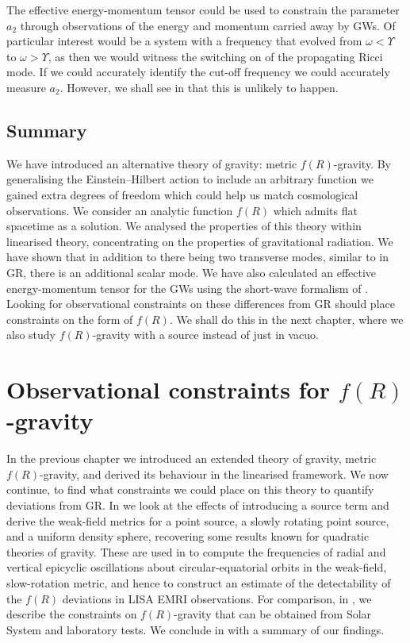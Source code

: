 The effective energy-momentum tensor could be used to constrain the parameter $a_2$ through observations of the energy and momentum carried away by GWs. Of particular interest would be a system with a frequency that evolved from $\omega < \Upsilon$ to $\omega > \Upsilon$, as then we would witness the switching on of the propagating Ricci mode. If we could accurately identify the cut-off frequency we could accurately measure $a_2$. However, we shall see in  that this is unlikely to happen.

\section{Summary}

We have introduced an alternative theory of gravity: metric $f(R)$-gravity. By generalising the Einstein--Hilbert action to include an arbitrary function we gained extra degrees of freedom which could help us match cosmological observations. We consider an analytic function $f(R)$ which admits flat spacetime as a solution. We analysed the properties of this theory within linearised theory, concentrating on the properties of gravitational radiation. We have shown that in addition to there being two transverse modes, similar to in GR, there is an additional scalar mode. We have also calculated an effective energy-momentum tensor for the GWs using the short-wave formalism of \citet{Isaacson1968,Isaacson1968a}. Looking for observational constraints on these differences from GR should place constraints on the form of $f(R)$. We shall do this in the next chapter, where we also study $f(R)$-gravity with a source instead of just in vacuo.


\chapter{Observational constraints for $f(R)$-gravity\label{ch:f-R2}}

In the previous chapter we introduced an extended theory of gravity, metric $f(R)$-gravity, and derived its behaviour in the linearised framework. We now continue, to find what constraints we could place on this theory to quantify deviations from GR. In  we look at the effects of introducing a source term and derive the weak-field metrics for a point source, a slowly rotating point source, and a uniform density sphere, recovering some results known for quadratic theories of gravity. These are used in  to compute the frequencies of radial and vertical epicyclic oscillations about circular-equatorial orbits in the weak-field, slow-rotation metric, and hence to construct an estimate of the detectability of the $f(R)$ deviations in LISA EMRI observations. For comparison, in , we describe the constraints on $f(R)$-gravity that can be obtained from Solar System and laboratory tests. We conclude in  with a summary of our findings.

